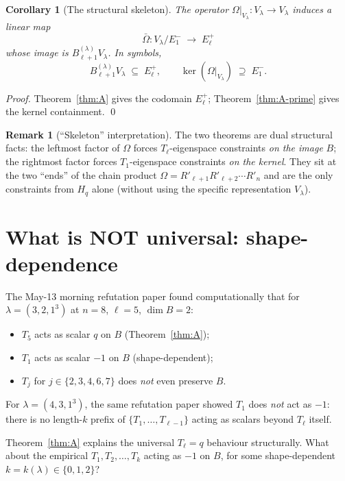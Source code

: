 \documentclass[11pt]{article}
\newtheorem{corollary}[theorem]{Corollary}
\theoremstyle{definition}
\newtheorem{remark}[theorem]{Remark}
\newcommand{\Hq}{H_q}
\newcommand{\Bdec}{B_{\ell+1}^{(\lambda)}}
\newcommand{\Om}{\Omega}
\begin{document}
\begin{corollary}[The structural skeleton]\label{cor:skeleton}
The operator $\Om|_{V_\lambda}: V_\lambda \to V_\lambda$ induces a
linear map
\[
   \bar\Om: V_\lambda / E_1^- \;\longrightarrow\; E_\ell^+
\]
whose image is $\Bdec V_\lambda$. In symbols,
\[
   \Bdec V_\lambda \;\subseteq\; E_\ell^+, \qquad
   \ker(\Om|_{V_\lambda}) \;\supseteq\; E_1^-.
\]
\end{corollary}

\begin{proof}
Theorem~\ref{thm:A} gives the codomain $E_\ell^+$;
Theorem~\ref{thm:A-prime} gives the kernel containment. \qed
\end{proof}

\begin{remark}[``Skeleton'' interpretation]
The two theorems are dual structural facts: the leftmost factor of $\Om$
forces $T_\ell$-eigenspace constraints \emph{on the image} $B$; the
rightmost factor forces $T_1$-eigenspace constraints \emph{on the
kernel}. They sit at the two ``ends'' of the chain product
$\Om = R'_{\ell+1} R'_{\ell+2} \cdots R'_n$ and are the only
constraints from $\Hq$ alone (without using the specific
representation $V_\lambda$).
\end{remark}

\section{What is NOT universal: shape-dependence}\label{sec:shape}

The May-13 morning refutation paper found computationally that for
$\lambda = (3,2,1^3)$ at $n = 8$, $\ell = 5$, $\dim B = 2$:
\begin{itemize}[topsep=0.2em,itemsep=0.1em]
\item $T_5$ acts as scalar $q$ on $B$ \quad (Theorem~\ref{thm:A});
\item $T_1$ acts as scalar $-1$ on $B$ \quad (shape-dependent);
\item $T_j$ for $j \in \{2,3,4,6,7\}$ does \emph{not} even preserve $B$.
\end{itemize}
For $\lambda = (4, 3, 1^3)$, the same refutation paper showed $T_1$ does
\emph{not} act as $-1$: there is no length-$k$ prefix of $\{T_1, \ldots,
T_{\ell-1}\}$ acting as scalars beyond $T_\ell$ itself.

Theorem~\ref{thm:A} explains the universal $T_\ell = q$ behaviour
structurally. What about the empirical $T_1, T_2, \ldots, T_k$ acting as
$-1$ on $B$, for some shape-dependent $k = k(\lambda) \in \{0, 1, 2\}$?
\end{document}
